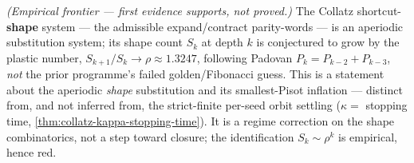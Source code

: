 \begin{theorem}
  \label{thm:collatz-padovan-shape-law}
  \notready
  \emph{(Empirical frontier --- first evidence supports, not proved.)} The Collatz shortcut-\textbf{%
  shape} system --- the admissible expand/contract parity-words --- is an aperiodic substitution
  system; its shape count $S_k$ at depth $k$ is conjectured to grow by the plastic number,
  $S_{k+1}/S_k\to\rho\approx1.3247$, following Padovan $P_k=P_{k-2}+P_{k-3}$, \emph{not} the prior
  programme's failed golden/Fibonacci guess. This is a statement about the aperiodic \emph{shape} substitution and its
  smallest-Pisot inflation --- distinct from, and not inferred from, the strict-finite per-seed
  orbit settling ($\kappa=$ stopping time, \cref{thm:collatz-kappa-stopping-time}). It is a regime
  correction on the shape combinatorics, not a step toward closure; the identification
  $S_k\sim\rho^k$ is empirical, hence red.
\end{theorem}
